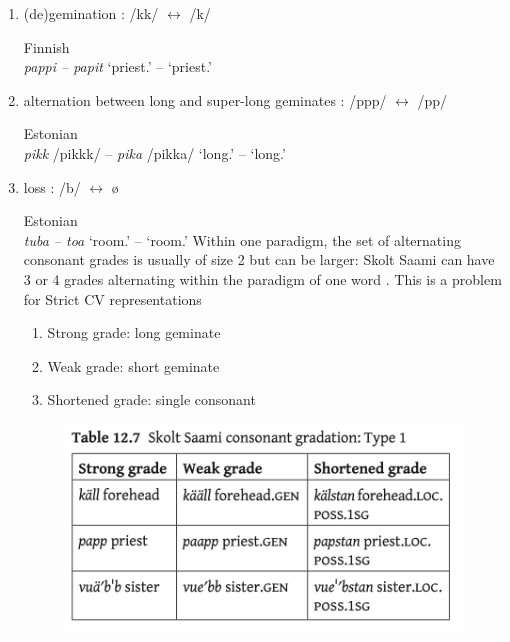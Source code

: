 \documentclass[a4paper, 12pt]{article}
\begin{document}
	\begin{enumerate}[$\gg$]
	\setlength\itemsep{0em}
		\item (de)gemination : /kk/ $\leftrightarrow$ /k/
		
		\ex Finnish\\
			\emph{pappi -- papit} \hfill `priest.{\Nom}' -- `priest.{\Pl}'
		\xe
		
		\item alternation between long and super-long geminates : /ppp/ $\leftrightarrow$ /pp/
		
		\ex Estonian\\
			\emph{pikk} /pikkk/ -- \emph{pika} /pikka/ \hfill `long.{\Nom}' -- `long.{\Gen}'
		\xe
		
		\item loss : /b/ $\leftrightarrow$ ø
		
		\ex Estonian\\
			\emph{tuba -- toa} \hfill `room.{\Nom}' -- `room.{\Gen}'
		\xe
	Within one paradigm, the set of alternating consonant grades is usually of size 2 but can be larger: Skolt Saami can have 3 or 4 grades alternating within the paradigm of one word \parencite{koponen2022}. This is a problem for Strict CV representations
	
	\begin{enumerate}[$\cdot$]
	\setlength\itemsep{0em}
		\item Strong grade: long geminate
		\item Weak grade: short geminate
		\item Shortened grade: single consonant
	\end{enumerate}
	
	\begin{figure}[H]
		\includegraphics[scale=.6]{skolt-grades1}
	\end{figure}
	

\end{enumerate}
\end{document}
